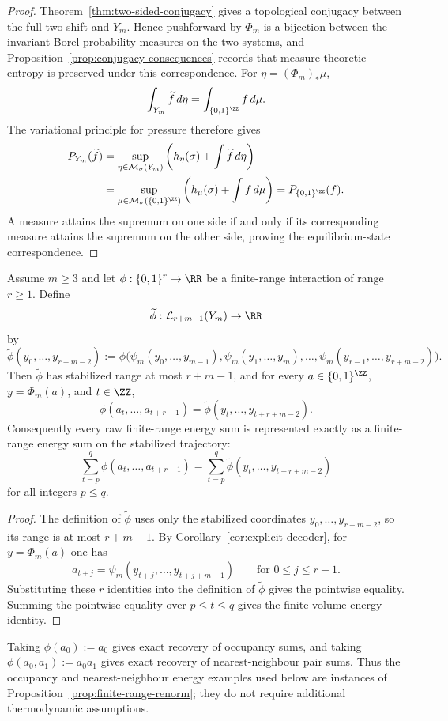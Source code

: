 \begin{proof}
Theorem~\ref{thm:two-sided-conjugacy} gives a topological conjugacy between
the full two-shift and $Y_m$.  Hence pushforward by $\Phi_m$ is a bijection
between the invariant Borel probability measures on the two systems, and
Proposition~\ref{prop:conjugacy-consequences} records that measure-theoretic
entropy is preserved under this correspondence.  For
$\eta=(\Phi_m)_*\mu$,
\[
\int_{Y_m}\widetilde f\,d\eta
=
\int_{\{0,1\}^{\ZZ}} f\,d\mu .
\]
The variational principle for pressure \cite{Walters1982} therefore gives
\[
\begin{aligned}
P_{Y_m}(\widetilde f)
&=\sup_{\eta\in\mathcal M_\sigma(Y_m)}
\left(h_\eta(\sigma)+\int\widetilde f\,d\eta\right)\\
&=\sup_{\mu\in\mathcal M_\sigma(\{0,1\}^{\ZZ})}
\left(h_\mu(\sigma)+\int f\,d\mu\right)
=P_{\{0,1\}^{\ZZ}}(f).
\end{aligned}
\]
A measure attains the supremum on one side if and only if its corresponding
measure attains the supremum on the other side, proving the equilibrium-state
correspondence.
\end{proof}

\begin{proposition}\label{prop:finite-range-renorm}
Assume $m\ge3$ and let $\phi:\{0,1\}^r\to\RR$ be a finite-range interaction
of range $r\ge1$.  Define
\[
\widetilde\phi:\mathcal L_{r+m-1}(Y_m)\to\RR
\]
by
\[
\widetilde\phi(y_0,\ldots,y_{r+m-2})
:=
\phi\bigl(
\psi_m(y_0,\ldots,y_{m-1}),
\psi_m(y_1,\ldots,y_m),
\ldots,
\psi_m(y_{r-1},\ldots,y_{r+m-2})
\bigr).
\]
Then $\widetilde\phi$ has stabilized range at most $r+m-1$, and for every
$a\in\{0,1\}^{\ZZ}$, $y=\Phi_m(a)$, and $t\in\ZZ$,
\[
\phi(a_t,\ldots,a_{t+r-1})
=
\widetilde\phi(y_t,\ldots,y_{t+r+m-2}).
\]
Consequently every raw finite-range energy sum is represented exactly as a
finite-range energy sum on the stabilized trajectory:
\[
\sum_{t=p}^{q}\phi(a_t,\ldots,a_{t+r-1})
=
\sum_{t=p}^{q}\widetilde\phi(y_t,\ldots,y_{t+r+m-2})
\]
for all integers $p\le q$.
\end{proposition}

\begin{proof}
The definition of $\widetilde\phi$ uses only the stabilized coordinates
$y_0,\ldots,y_{r+m-2}$, so its range is at most $r+m-1$.  By
Corollary~\ref{cor:explicit-decoder}, for $y=\Phi_m(a)$ one has
\[
a_{t+j}=\psi_m(y_{t+j},\ldots,y_{t+j+m-1})
\qquad\text{for }0\le j\le r-1.
\]
Substituting these $r$ identities into the definition of $\widetilde\phi$
gives the pointwise equality.  Summing the pointwise equality over
$p\le t\le q$ gives the finite-volume energy identity.
\end{proof}

\begin{remark}
Taking $\phi(a_0):=a_0$ gives exact recovery of occupancy sums, and taking
$\phi(a_0,a_1):=a_0a_1$ gives exact recovery of nearest-neighbour pair sums.
Thus the occupancy and nearest-neighbour energy examples used below are
instances of Proposition~\ref{prop:finite-range-renorm}; they do not require
additional thermodynamic assumptions.
\end{remark}
